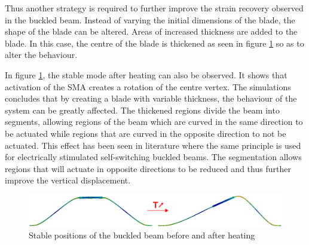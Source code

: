 Thus another strategy is required to further improve the strain recovery observed in the buckled beam. Instead of varying the initial dimensions of the blade, the shape of the blade can be altered. Areas of increased thickness are added to the blade. In this case, the centre of the blade is thickened as seen in figure \ref{fig:modechange} so as to alter the behaviour.

In figure \ref{fig:modechange}, the stable mode after heating can also be observed. It shows that activation of the SMA creates a rotation of the centre vertex. The simulations concludes that by creating a blade with variable thickness, the behaviour of the system can be greatly affected. The thickened regions divide the beam into segments, allowing regions of the beam which are curved in the same direction to be actuated while regions that are curved in the opposite direction to not be actuated. This effect has been seen in literature\cite{rossiter_self-switching_2006} where the same principle is used for electrically stimulated self-switching buckled beams. The segmentation allows regions that will actuate in opposite directions to be reduced and thus further improve the vertical displacement.

\begin{figure}[H]
  \centering
  \includegraphics[width=\textwidth]{Figures/FigCentBumpTransformation.eps}
  \caption{Stable positions of the buckled beam before and after heating}
  \label{fig:modechange}
\end{figure}


